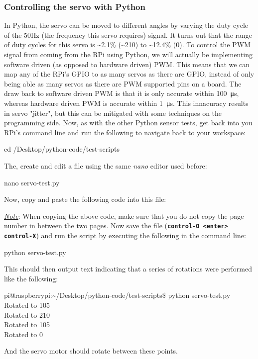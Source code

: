\documentclass{article}
\newcommand*{\myfont}{\fontfamily{pcr}\selectfont}
\newcommand{\codeb}[2]{
  \begin{tcolorbox}[width=\textwidth,colback={SpringGreen},title={#1},colbacktitle=DarkGreen,coltitle=SpringGreen]
    \myfont
    #2
  \end{tcolorbox}
} %
\newcommand{\outputb}[2]{
  \begin{tcolorbox}[width=\textwidth,colback={light-gray},title={#1},colbacktitle=gray,coltitle=light-gray]
    \myfont
    #2
  \end{tcolorbox}
} %
\newcommand{\note}[1]{\underline{\textit{Note}}: #1}
\begin{document}
    \subsubsection{Controlling the servo with Python}
    In Python, the servo can be moved to different angles by varying the duty cycle of the 50Hz (the frequency this servo requires) signal. It turns out that the range of duty cycles for this servo is \textasciitilde2.1\% (\textasciitilde210\degree) to \textasciitilde12.4\% (0\degree). To control the PWM signal from coming from the RPi using Python, we will actually be implementing software driven (as opposed to hardware driven) PWM. This means that we can map any of the RPi's GPIO to as many servos as there are GPIO, instead of only being able as many servos as there are PWM supported pins on a board. The draw back to software driven PWM is that it is only accurate within \SI{100}{\micro\second}, whereas hardware driven PWM is accurate within \SI{1}{\micro\second}. This innacuracy results in servo "jitter", but this can be mitigated with some techniques on the programming side. Now, as with the other Python sensor tests, get back into you RPi's command line and run the following to navigate back to your workspace:
    \codeb{Navigate to your workspace}
    {
      cd  /Desktop/python-code/test-scripts
    }
    The, create and edit a file using the same \textit{nano} editor used before:
    \codeb{Create servo Python testing script file}
    {
      nano servo-test.py
    }
    Now, copy and paste the following code into this file:
     
    \note{When copying the above code, make sure that you do not copy the page number in between the two pages.}
    \newline
    \noindent
    Now save the file (\texttt{\textbf{control-O <enter> control-X}}) and run the script by executing the following in the command line:
    \codeb{Run the test script for the servo motor}
    {
      python servo-test.py
    }
    This should then output text indicating that a series of rotations were performed like the following:
    \outputb{Test script output for servo motor}
    {
      pi@raspberrypi:\textasciitilde/Desktop/python-code/test-scripts\$ python servo-test.py \\
      Rotated to 105\degree                                                        \\
      Rotated to 210\degree                                                        \\
      Rotated to 105\degree                                                        \\
      Rotated to 0\degree
    }
    And the servo motor should rotate between these points.
\end{document}
